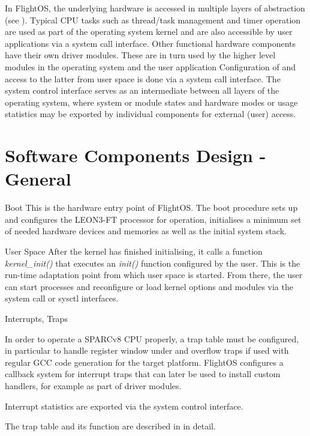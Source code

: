In FlightOS, the underlying hardware is accessed in multiple layers of
abstraction (see ). Typical \gls{CPU} tasks such as
thread/task management and timer operation are used as part of the operating
system kernel and are also accessible by user applications via a system call
interface. Other functional hardware components have their own driver modules.
These are in turn used by the higher level modules in the operating system and
the user application
Configuration of and access to the latter from user space is done via a system
call interface. The system control interface serves as an intermediate between
all layers of the operating system, where system or module states and hardware
modes or usage statistics may be exported by individual components for external
(user) access.




\section{Software Components Design - General}


%
{Boot}{%
This is the hardware entry point of FlightOS. The boot procedure sets up and
configures the \gls{LEON3-FT} processor for operation, initialises a minimum set of 
needed hardware devices and memories as well as the initial system stack.
}%
{}{}



{User Space}{%
After the kernel has finished initialising, it calls a function
\mbox{\emph{kernel\_init()}}
that executes an \emph{init()} function configured by the user. This is the
run-time adaptation point from which user space is started. From there, the user
can start processes and reconfigure or load kernel options and modules via the
system call or sysctl interfaces.
}%
{}{}



%
{Interrupts, Traps}
{In order to operate a \gls{SPARC}v8 \gls{CPU} properly, a trap table must be
configured, in particular to handle register window under and overflow traps if
used with regular \gls{GCC} code generation for the target platform.
FlightOS configures a callback system for interrupt traps that can later be used
to install custom handlers, for example as part of driver modules.\newline

Interrupt statistics are exported via the system control interface.
}%
{}%
{The trap table and its function are described in \cite{SPARCv8} in detail.}



